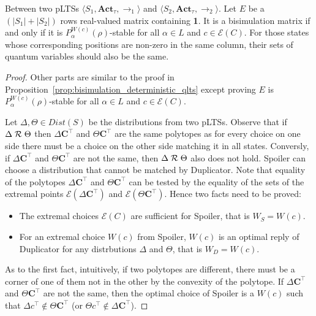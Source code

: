 \documentclass[runningheads]{llncs}
\newcommand{\pair}[1]{\langle{#1}\rangle}
\begin{document}
\begin{proposition}
\label{prop:bisimulation_nondeterministic_qlts}
Between two pLTSs $\pair{S_1,\textbf{Act}_{\tau},\rightarrow_1}$ and $\pair{S_2,\textbf{Act}_{\tau},\rightarrow_2}$. Let $E$ be a $(|S_1|+|S_2|)$ rows real-valued matrix containing \textbf{1}. It is a bisimulation matrix if and only if it is $P^{W(c)}_{\alpha}(\rho)$-stable for all $\alpha\in L$ and $c\in\mathcal{E}(C)$. For those states whose corresponding positions are non-zero in the same column, their sets of quantum variables should also be the same.
\begin{proof}
Other parts are similar to the proof in Proposition~\ref{prop:bisimulation_deterministic_qlts} except proving $E$ is $P^{W(c)}_{\alpha}(\rho)$-stable for all $\alpha\in L$ and $c\in\mathcal{E}(C)$.

Let $\Delta,\Theta\in Dist(S)$ be the distributions from two pLTSs. Observe that if $\Delta\mathrel{{\mathcal R }}\Theta$ then $\Delta\textbf{C}^{\top}$ and $\Theta\textbf{C}^{\top}$ are the same polytopes as for every choice on one side there must be a choice on the other side matching it in all states. Conversly, if $\Delta\textbf{C}^{\top}$ and $\Theta\textbf{C}^{\top}$ are not the same, then $\Delta\mathrel{{\mathcal R }}\Theta$ also does not hold. Spoiler can choose a distribution that cannot be matched by Duplicator. Note that equality of the polytopes $\Delta\textbf{C}^{\top}$ and $\Theta\textbf{C}^{\top}$ can be tested by the equality of the sets of the extremal points $\mathcal{E}(\Delta\textbf{C}^{\top})$ and $\mathcal{E}(\Theta\textbf{C}^{\top})$.
Hence two facts need to be proved:
\begin{itemize}
    \item The extremal choices $\mathcal{E}(C)$ are sufficient for Spoiler, that is $W_{S}=W(c)$.
    \item For an extremal choice $W(c)$ from Spoiler, $W(c)$ is an optimal reply of Duplicator for any distrbutions $\Delta$ and $\Theta$, that is $W_{D}=W(c)$.
\end{itemize}

As to the first fact, intuitively, if two polytopes are different, there must be a corner of one of them not in the other by the convexity of the polytope. If $\Delta\textbf{C}^{\top}$ and $\Theta\textbf{C}^{\top}$ are not the same, then the optimal choice of Spoiler is a $W(c)$ such that $\Delta c^{\top}\not\in\Theta\textbf{C}^{\top}$ (or $\Theta c^{\top}\not\in\Delta\textbf{C}^{\top}$).


\end{proof}
\end{proposition}
\end{document}
